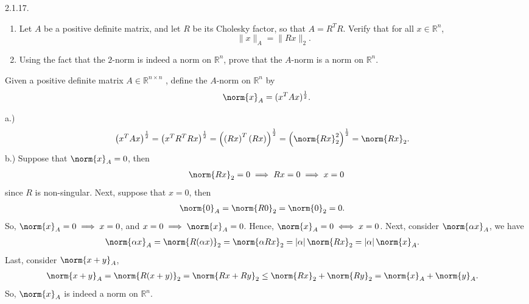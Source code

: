 \documentclass{report}
\begin{document}
    \bigbreak \noindent 
    \begin{mdframed}
        2.1.17. 
        \begin{enumerate}[label=(\alph*)]
            \item Let $A$ be a positive definite matrix, and let $R$ be its Cholesky factor, 
                so that $A = R^{T}R$. Verify that for all $x \in \mathbb{R}^n$, 
                \[
                    \|x\|_{A} = \|Rx\|_{2}.
                \]

            \item Using the fact that the $2$-norm is indeed a norm on $\mathbb{R}^n$, 
                prove that the $A$-norm is a norm on $\mathbb{R}^n$.
        \end{enumerate}
    \end{mdframed}
    \bigbreak \noindent 
    \begin{remark}
       Given a positive definite matrix $A \in \mathbb{R}^{n\times n}$ , define the $A$-norm on $\mathbb{R}^{n}$ by
       \begin{align*}
           \norm{x}_{A} = (x^{T}Ax)^{\frac{1}{2}}
       .\end{align*}
    \end{remark}
    \bigbreak \noindent 
    a.)
    \begin{align*}
        \left(x^{T}Ax\right)^{\frac{1}{2}} &= \left(x^{T}R^{T}Rx\right)^{\frac{1}{2}} = \left(\left(Rx\right)^{T}(Rx)\right)^{\frac{1}{2}} = \left(\norm{Rx}_{2}^{2}\right)^{\frac{1}{2}} = \norm{Rx}_{2}
    .\end{align*}
    \bigbreak \noindent 
    b.) Suppose that $\norm{x}_{A} = 0$, then
    \begin{align*}
        \norm{Rx}_{2} = 0 \implies Rx = 0 \implies x = 0
    \end{align*}
    since $R$ is non-singular. Next, suppose that $x = 0$, then
    \begin{align*}
        \norm{0}_{A} &= \norm{R0}_{2} = \norm{0}_{2} = 0
    .\end{align*}
    So, $\norm{x}_{A} = 0 \implies x=0$, and $x=0 \implies \norm{x}_{A} = 0$. Hence, $\norm{x}_{A} = 0 \iff x = 0 $.
    \bigbreak \noindent 
    Next, consider $\norm{\alpha x}_{A}$, we have
    \begin{align*}
        \norm{\alpha x}_{A} &= \norm{R(\alpha x)}_{2} = \norm{\alpha Rx}_{2} = \left\lvert \alpha \right\rvert \norm{Rx}_{2} = \left\lvert \alpha \right\rvert \norm{x}_{A}
    .\end{align*}
    Last, consider $\norm{x +y }_{A}$,
    \begin{align*}
        \norm{x + y}_{A} &= \norm{R(x+y)}_{2} = \norm{Rx + Ry}_{2} \leq \norm{Rx}_{2} + \norm{Ry}_{2} = \norm{x}_{A} + \norm{y}_{A}
    .\end{align*}
    So, $\norm{x}_{A}$ is indeed a norm on $\mathbb{R}^{n}$.
\end{document}
